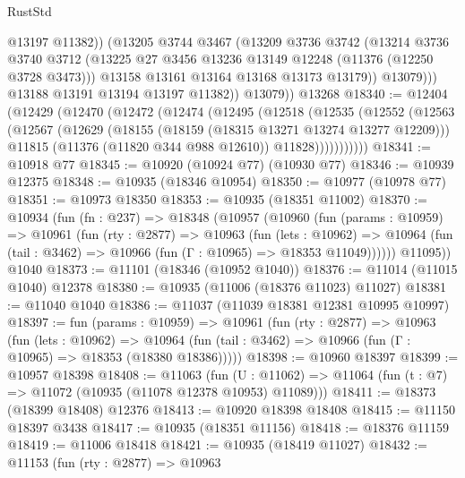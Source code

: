 \begin{lexlean}{RustStd}
\begin{coremodule}
{\begin{coremodule}
{{{{{{{{{{{{{{{{{{{{{{{{{{{{{{{{{{{{{{{{{{{{{{{{{{{{{{{{{{{{{{{{{{{{{{{{{{{{{{{{{{{{{                    @13197
                    @11382))
                (@13205
                  @3744
                  @3467
                  (@13209
                    @3736
                    @3742
                    (@13214
                      @3736
                      @3740
                      @3712
                      (@13225 @27 @3456 @13236 @13149 @12248 (@11376 (@12250 @3728 @3473)))
                      @13158
                      @13161
                      @13164
                      @13168
                      @13173
                      @13179))
                  @13079)))
            @13188
            @13191
            @13194
            @13197
            @11382))
        @13079))
    @13268
@18340 := @12404
    (@12429
      (@12470
        (@12472
          (@12474
            (@12495
              (@12518
                (@12535
                  (@12552
                    (@12563
                      (@12567
                        (@12629
                          (@18155 (@18159 (@18315 @13271 @13274 @13277 @12209)))
                          @11815
                          (@11376 (@11820 @344 @988 @12610))
                          @11828)))))))))))
@18341 := @10918 @77
@18345 := @10920 (@10924 @77) (@10930 @77)
@18346 := @10939 @12375
@18348 := @10935 (@18346 @10954)
@18350 := @10977 (@10978 @77)
@18351 := @10973 @18350
@18353 := @10935 (@18351 @11002)
@18370 := @10934
    (fun (fn : @237) =>
    @18348
      (@10957
        (@10960
          (fun (params : @10959) =>
          @10961
            (fun (rty : @2877) =>
            @10963
              (fun (lets : @10962) =>
              @10964 (fun (tail : @3462) => @10966 (fun (Γ : @10965) => @18353 @11049))))))
        @11095))
    @1040
@18373 := @11101 (@18346 (@10952 @1040))
@18376 := @11014 (@11015 @1040) @12378
@18380 := @10935 (@11006 (@18376 @11023) @11027)
@18381 := @11040 @1040
@18386 := @11037 (@11039 @18381 @12381 @10995 @10997)
@18397 := fun (params : @10959) =>
  @10961
    (fun (rty : @2877) =>
    @10963
      (fun (lets : @10962) =>
      @10964 (fun (tail : @3462) => @10966 (fun (Γ : @10965) => @18353 (@18380 @18386)))))
@18398 := @10960 @18397
@18399 := @10957 @18398
@18408 := @11063
    (fun (U : @11062) => @11064 (fun (t : @7) => @11072 (@10935 (@11078 @12378 @10953) @11089)))
@18411 := @18373 (@18399 @18408) @12376
@18413 := @10920 @18398 @18408
@18415 := @11150 @18397 @3438
@18417 := @10935 (@18351 @11156)
@18418 := @18376 @11159
@18419 := @11006 @18418
@18421 := @10935 (@18419 @11027)
@18432 := @11153
    (fun (rty : @2877) =>
    @10963
}}}}}}}}}}}}}}}}}}}}}}}}}}}}}}}}}}}}}}}}}}}}}}}}}}}}}}}}}}}}}}}}}}}}}}}}}}}}}}}}}}}}}
\end{coremodule}}
\end{coremodule}
\end{lexlean}
